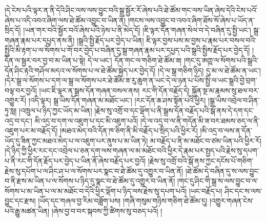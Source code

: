།དེ་ངེས་པའི་ལྟར་ན་ནི་དེའི་ཤིང་ལས་ལས་བྱུང་བའི་སྒྲ་སྦྱོར་རོ་ཞེས་པའི་ཐེ་ཚོམ་གང་ལས་ཡིན་ཞེས་དེའི་ངེས་པའོ་ཞེས་པ་འདི་འབའ་ཞིག་ལས་ཐེ་ཚོམ་འབྱུང་བ་ཡིན་ནོ། །གངས་ལས་འབྱུང་བ་འབའ་ཞིག་ཐོས་སོ་ཞེས་པ་ཡོད་ན་སྲིད་དོ། །ཡན་གར་བའི་སྦྱོར་བའོ་ཞེས་པའི་ཉེས་པ་ནི་མེད་དོ། །ཇི་ལྟར་དོན་གཞན་སེལ་བ་དེ་བཞིན་དུ་སྤྱི་ཡང་། སྒྲ་གཞན་རྣམ་པར་དཔྱད་ནས་ནི། །སྒྲའི་སྤྱི་རྗོད་པར་བྱེད་པ་ཡིན། ཇི་ལྟར་བྱས་པས་མ་བྱས་པ་རྣམ་པར་བསལ་བའི་སྤྱིའི་མི་རྟག་པ་ལ་སོགས་པ་གོ་བར་བྱེད་པ་བཞིན་དུ་སྒྲ་གཞན་རྣམ་པར་དཔྱད་པའི་སྒྲའི་སྤྱིས་རྗོད་པར་བྱེད་དོ། །དོན་ལ་སྦྱར་བར་བྱ་བ་མ་ཡིན་པ་སྟེ། དེ་ལ་ཡང་། དོན་གང་ལ་གཅིག་ཐེ་ཚོམ་ཟ། །གང་དུ་ཨཀྵ་ལ་སོགས་པའི་སྒྲའི་དོན་ཤིང་རྟའི་གཤོལ་མདའ་ལ་སོགས་པ་ལ་ཐེ་ཚོམ་སྐྱེད་པར་བྱེད་དོ། །དེ་ལ་སྒྲ་གཅིག་ཉིད། དུ་མ་ལ་ཐེ་ཚོམ་ན་ཡང་། །དེར་སྒྲ་ལ་སོགས་པ་དག་ལ་སྒྲ་ལ་སོགས་པར་ཐེ་ཚོམ་ཟ་རུ་ཆུག་ན་ཡང་དེ་ལ་ཉན་པ་པོས་སྤྱི་ལ་ཡང་སྒྲའི་བྱེ་བྲག་བལྟ་བར་བྱའོ། །ཡང་ཇི་ལྟར་ན་སྒྲས་དོན་གཞན་བསལ་ནས། རང་གི་དོན་བརྗོད་དེ། སྐྱོན་སྔ་མ་རྣམས་སུ་ཐལ་བར་འགྱུར་རོ། །འདི་ལྟར། སྒྲ་ཡིས་དོན་གཞན་མ་མཐོང་ཡང་། །རང་དོན་ཆ་ཤས་སྟོན་པའི་ཕྱིར། །སྒྲ་ཡིས་འབྲེལ་བ་ཤིན་ཏུ་སླ། །འཁྲུལ་པ་ཉིད་ཀྱང་ཡོད་མ་ཡིན། །རྗེས་སུ་འགྲོ་བ་དང་ལྡོག་པ་ནི་སྒྲས་དོན་བརྗོད་པའི་སྒོ་ནས་དེ་དག་དང་འདྲ་བ་དང་། མི་འདྲ་བ་དག་ལ་འཇུག་པ་དང་མི་འཇུག་པའོ། །དེ་ལ་འདྲ་བ་ལ་ནི་གདོན་མི་ཟ་བར་ཐམས་ཅད་ལ་ནི་འཇུག་པར་མ་བརྗོད་དོ། །མཐའ་མེད་བའི་དོན་ཁ་ཅིག་ནི་མི་བརྗོད་པ་སྲིད་པའི་ཕྱིར་རོ། །མི་འདྲ་བ་ལས་ན་དོན་ཡོད་དུ་ཟིན་ཀྱང་མཐའ་མེད་པ་ལ་འཇུག་པར་ནུས་པ་མ་ཡིན་ཏེ། མ་བརྗོད་པ་ནི་མ་མཐོང་བ་ཙམ་ཡིན་པའི་ཕྱིར་རོ། །དེ་ཉིད་ཀྱི་ཕྱིར་རང་དང་འབྲེལ་པ་ཅན་དག་ལས་གཞན་ལ་མ་མཐོང་བའི་ཕྱིར་དེ་རྣམ་པར་སྤྱད་པའི་རྗེས་སུ་དཔག་པ་ནི་རང་གི་དོན་རྗོད་པར་བྱེད་པ་ཡིན་ནོ་ཞེས་བརྗོད་པར་བྱའོ། །རྗེས་སུ་འགྲོ་བའི་སྒོ་ནས་ཀྱང་དངོས་པོ་གཅིག་རྗེས་སུ་དཔོག་པ་ལ་ཤིང་ཤ་པ་ལ་སོགས་པར་སྣང་བ་ཐེ་ཚོམ་དུ་འགྱུར་བ་ཡིན་ནོ། །ཐེ་ཚོམ་དེ་བཞིན་དུ་ས་ལས་བྱུང་བ་ནི་རྫས་མ་ཡིན་པ་ལ་སོགས་པ་ཉིད་དུ་སྣང་བ་ཐེ་ཚོམ་དུ་འགྱུར་བ་ཡིན་ནོ། །གང་དུ་ཤིང་གི་སྒྲ་ས་ལས་བྱུང་བ་ལ་སོགས་པ་མ་ཡིན་པ་ལ་མ་མཐོང་བ་དེའི་ཕྱིར་ལྡོག་པ་ཉིད་ལས་རྗེས་སུ་དཔག་པའོ། །ཡང་བརྗོད་པ། ཤིང་དང་ས་ལས་བྱུང་དང་རྫས། །ཡོད་དང་གཞལ་བྱ་རིམ་བཟློག་པས། །གཞི་གསུམ་གཉིས་གཅིག་ཐེ་ཚོམ་དུ། །འགྱུར་གཞན་ངེས་པའི་རྒྱུ་མཚན་ཡིན། །ཞེས་བྱ་བ་བར་སྐབས་ཀྱི་ཚིགས་སུ་བཅད་པའོ། །
